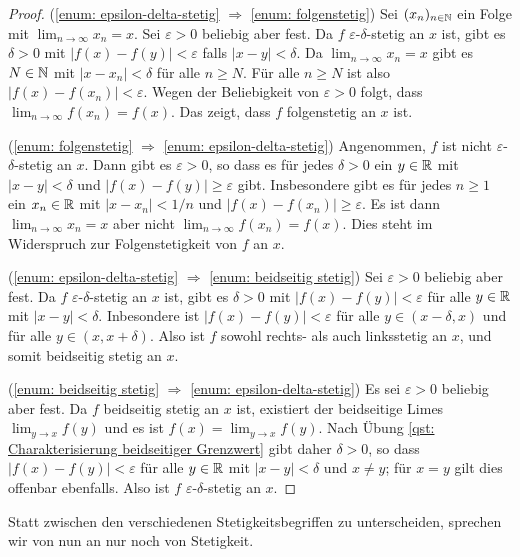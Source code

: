 \documentclass[a4paper,10pt]{article}
\begin{document}
\begin{proof}
 (\ref{enum: epsilon-delta-stetig} $\Rightarrow$ \ref{enum: folgenstetig})
 Sei $(x_n)_{n \in \mathbb{N}}$ ein Folge mit $\lim_{n \to \infty} x_n = x$. Sei $\varepsilon > 0$ beliebig aber fest. Da $f$ $\varepsilon$-$\delta$-stetig an $x$ ist, gibt es $\delta > 0$ mit $|f(x)-f(y)| < \varepsilon$ falls $|x-y| < \delta$. Da $\lim_{n \to \infty} x_n = x$ gibt es $N \in \mathbb{N}$ mit $|x-x_n| < \delta$ für alle $n \geq N$. Für alle $n \geq N$ ist also $|f(x)-f(x_n)| < \varepsilon$. Wegen der Beliebigkeit von $\varepsilon > 0$ folgt, dass $\lim_{n \to \infty} f(x_n) = f(x)$. Das zeigt, dass $f$ folgenstetig an $x$ ist.

 (\ref{enum: folgenstetig} $\Rightarrow$ \ref{enum: epsilon-delta-stetig})
 Angenommen, $f$ ist nicht $\varepsilon$-$\delta$-stetig an $x$. Dann gibt es $\varepsilon > 0$, so dass es für jedes $\delta > 0$ ein $y \in \mathbb{R}$ mit $|x-y| < \delta$ und $|f(x)-f(y)| \geq \varepsilon$ gibt. Insbesondere gibt es für jedes $n \geq 1$ ein $x_n \in \mathbb{R}$ mit $|x - x_n| < 1/n$ und $|f(x) - f(x_n)| \geq \varepsilon$. Es ist dann $\lim_{n \to \infty} x_n = x$ aber nicht $\lim_{n \to \infty} f(x_n) = f(x)$. Dies steht im Widerspruch zur Folgenstetigkeit von $f$ an $x$.
 
 (\ref{enum: epsilon-delta-stetig} $\Rightarrow$ \ref{enum: beidseitig stetig})
 Sei $\varepsilon > 0$ beliebig aber fest. Da $f$ $\varepsilon$-$\delta$-stetig an $x$ ist, gibt es $\delta > 0$ mit $|f(x)-f(y)| < \varepsilon$ für alle $y \in \mathbb{R}$ mit $|x-y| < \delta$. Inbesondere ist $|f(x)-f(y)| < \varepsilon$ für alle $y \in (x-\delta,x)$ und für alle $y \in (x,x+\delta)$. Also ist $f$ sowohl rechts- als auch linksstetig an $x$, und somit beidseitig stetig an $x$.
 
 (\ref{enum: beidseitig stetig} $\Rightarrow$ \ref{enum: epsilon-delta-stetig})
 Es sei $\varepsilon > 0$ beliebig aber fest. Da $f$ beidseitig stetig an $x$ ist, existiert der beidseitige Limes $\lim_{y \to x} f(y)$ und es ist $f(x) = \lim_{y \to x} f(y)$. Nach Übung \ref{qst: Charakterisierung beidseitiger Grenzwert} gibt daher $\delta > 0$, so dass $|f(x)-f(y)| < \varepsilon$ für alle $y \in \mathbb{R}$ mit $|x-y| < \delta$ und $x \neq y$; für $x = y$ gilt dies offenbar ebenfalls. Also ist $f$ $\varepsilon$-$\delta$-stetig an $x$.
\end{proof}


Statt zwischen den verschiedenen Stetigkeitsbegriffen zu unterscheiden, sprechen wir von nun an nur noch von Stetigkeit.
\end{document}
